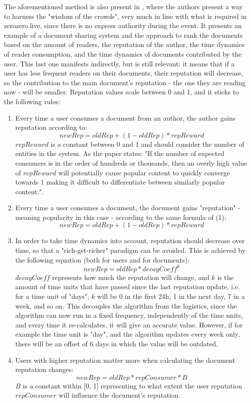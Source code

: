 The aforementioned method is also present in \cite{Daly2009}, where the authors present a way to harness the "wisdom of the crowds", very much in line with what is required in zerozero.live, since there is no express authority during the event. It presents an example of a document sharing system and the approach to rank the documents based on the amount of readers, the reputation of the author, the time dynamics of reader consumption, and the time dynamics of documents contributed by the user. This last one manifests indirectly, but is still relevant: it means that if a user has less frequent readers on their documents, their reputation will decrease, so the contribution to the main document's reputation - the one they are reading now - will be smaller.
Reputation values scale between 0 and 1, and it sticks to the following rules:
\begin{enumerate}
    \item Every time a user consumes a document from an author, the author gains reputation according to:
    \[newRep = oldRep + (1 - oldRep) * repReward\]
    $repReward$ is a constant between 0 and 1 and should consider the number of entities in the system. As the paper states: "If the number of expected consumers is in the order of hundreds or thousands, then an overly high value of $repReward$ will potentially cause popular content to quickly converge towards 1 making it difﬁcult to differentiate between similarly popular content.".
    \item Every time a user consumes a document, the document gains "reputation" - meaning popularity in this case - according to the same formula of (1):
    \[newRep = oldRep + (1 - oldRep) * repReward\]
    \item In order to take time dynamics into account, reputation should decrease over time, so that a "rich-get-richer" paradigm can be avoided. This is achieved by the following equation (both for users and for documents):
    \[newRep = oldRep * decayCoeff^k\]
    $decayCoeff$ represents how much the reputation will change, and $k$ is the amount of time units that have passed since the last reputation update, i.e. for a time unit of "days", $k$ will be 0 in the first 24h, 1 in the next day, 7 in a week, and so on. This decouples the algorithm from the logistics, since the algorithm can now run in a fixed frequency, independently of the time units, and every time it re-calculates, it will give an accurate value. However, if for example the time unit is "day", and the algorithm updates every week only, there will be an offset of 6 days in which the value will be outdated.
    \item Users with higher reputation matter more when calculating the document reputation changes:
    \[newRep = oldRep * repConsumer * B\]
    $B$ is a constant within [0, 1] representing to what extent the user reputation $repConsumer$ will influence the document's reputation.


\end{enumerate}
